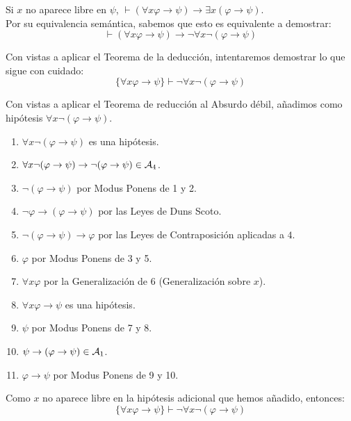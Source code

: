 \begin{ejercicio}\label{ej:2.11}
    Si $x$ no aparece libre en $\psi$, $\vdash (\forall x \varphi \rightarrow \psi) \rightarrow \exists x(\varphi \rightarrow \psi)$.\\

    Por su equivalencia semántica, sabemos que esto es equivalente a demostrar:
    \begin{equation*}
        \vdash (\forall x \varphi \rightarrow \psi) \rightarrow \neg\forall x \neg(\varphi \rightarrow \psi)
    \end{equation*}

    Con vistas a aplicar el Teorema de la deducción, intentaremos demostrar lo que sigue con cuidado:
    \begin{equation*}
        \{\forall x \varphi \rightarrow \psi\} \vdash \neg\forall x \neg(\varphi \rightarrow \psi)
    \end{equation*}

    Con vistas a aplicar el Teorema de reducción al Absurdo débil, añadimos como hipótesis $\forall x \neg(\varphi \rightarrow \psi)$.
    \begin{enumerate}
        \item $\forall x \neg(\varphi \rightarrow \psi)$ es una hipótesis.
        \item $\forall x \neg(\varphi \rightarrow \psi)\rightarrow \neg(\varphi \rightarrow \psi)\in \mathcal{A}_4$.
        \item $\neg(\varphi \rightarrow \psi)$ por Modus Ponens de 1 y 2.
        \item $\neg \varphi\rightarrow (\varphi \rightarrow \psi)$ por las Leyes de Duns Scoto.
        \item $\neg(\varphi \rightarrow \psi)\rightarrow \varphi$ por las Leyes de Contraposición aplicadas a $4$.
        \item $\varphi$ por Modus Ponens de 3 y 5.
        \item $\forall x \varphi$ por la Generalización de 6 \qquad (Generalización sobre $x$).
        \item $\forall x \varphi \rightarrow \psi$ es una hipótesis.
        \item $\psi$ por Modus Ponens de 7 y 8.
        \item $\psi\to (\varphi\to \psi)\in\mathcal{A}_1$.
        \item $\varphi\to \psi$ por Modus Ponens de 9 y 10. 
    \end{enumerate}

    Como $x$ no aparece libre en la hipótesis adicional que hemos añadido, entonces:
    \begin{equation*}
        \{\forall x \varphi \rightarrow \psi\} \vdash \neg\forall x \neg(\varphi \rightarrow \psi)
    \end{equation*}


\end{ejercicio}
